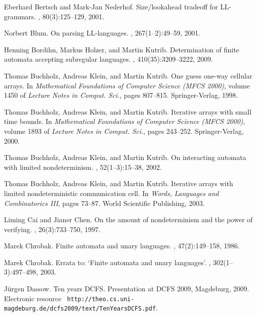 \documentclass[copyright]{eptcs}
\begin{document}
 \begin{thebibliography}{10}

Eberhard Bertsch and Mark-Jan Nederhof.
\newblock Size/lookahead tradeoff for {L}{L}-grammars.
, 80(3):125--129, 2001.

Norbert Blum.
\newblock On parsing {L}{L}-languages.
, 267(1--2):49--59, 2001.

Henning Bordihn, Markus Holzer, and Martin Kutrib.
\newblock Determination of finite automata accepting subregular languages.
, 410(35):3209--3222, 2009.

Thomas Buchholz, Andreas Klein, and Martin Kutrib.
\newblock One guess one-way cellular arrays.
\newblock In {\em Mathematical Foundations of Computer Science ({MFCS} 2000)},
  volume 1450 of {\em Lecture Notes in Comput. Sci.}, pages 807--815.
  Springer-Verlag, 1998.

Thomas Buchholz, Andreas Klein, and Martin Kutrib.
\newblock Iterative arrays with small time bounds.
\newblock In {\em Mathematical Foundations of Computer Science ({MFCS} 2000)},
  volume 1893 of {\em Lecture Notes in Comput. Sci.}, pages 243--252.
  Springer-Verlag, 2000.

Thomas Buchholz, Andreas Klein, and Martin Kutrib.
\newblock On interacting automata with limited nondeterminism.
, 52(1--3):15--38, 2002.

Thomas Buchholz, Andreas Klein, and Martin Kutrib.
\newblock Iterative arrays with limited nondeterministic communication cell.
\newblock In {\em Words, Languages and Combinatorics III}, pages 73--87. World
  Scientific Publishing, 2003.

Liming Cai and Jianer Chen.
\newblock On the amount of nondeterminism and the power of verifying.
, 26(3):733--750, 1997.

Marek Chrobak.
\newblock Finite automata and unary languages.
, 47(2):149--158, 1986.

Marek Chrobak.
\newblock Errata to: `{F}inite automata and unary languages'.
, 302(1--3):497--498, 2003.

J{\"u}rgen Dassow.
\newblock Ten years {DCFS}.
\newblock Presentation at DCFS 2009, Magdeburg, 2009. Electronic resource {\tt
  http://theo.cs.uni-magdeburg.de/dcfs2009/text/TenYearsDCFS.pdf}.


\end{thebibliography}
\end{document}

